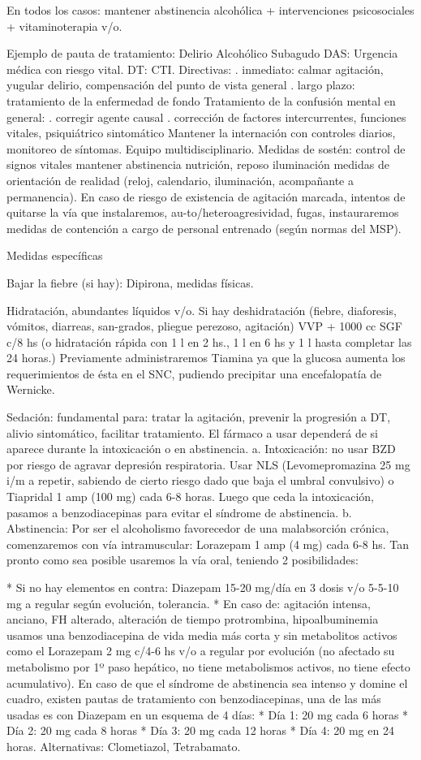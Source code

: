 \documentclass[encares.tex]{subfiles}
\begin{document}
En todos los casos: mantener abstinencia alcohólica + intervenciones psicosociales + vitaminoterapia v/o.

Ejemplo de pauta de tratamiento: Delirio Alcohólico Subagudo DAS: Urgencia médica con riesgo vital. DT: CTI. Directivas: . inmediato: calmar agitación, yugular delirio, compensación del punto de vista general . largo plazo: tratamiento de la enfermedad de fondo Tratamiento de la confusión mental en general: . corregir agente causal . corrección de factores intercurrentes, funciones vitales, psiquiátrico sintomático Mantener la internación con controles diarios, monitoreo de síntomas. Equipo multidisciplinario. Medidas de sostén: control de signos vitales mantener abstinencia nutrición, reposo iluminación medidas de orientación de realidad (reloj, calendario, iluminación, acompañante a permanencia). En caso de riesgo de existencia de agitación marcada, intentos de quitarse la vía que instalaremos, au-to/heteroagresividad, fugas, instauraremos medidas de contención a cargo de personal entrenado (según normas del MSP).

Medidas específicas

Bajar la fiebre (si hay): Dipirona, medidas físicas.

Hidratación, abundantes líquidos v/o. Si hay deshidratación (fiebre, diaforesis, vómitos, diarreas, san-grados, pliegue perezoso, agitación) VVP + 1000 cc SGF c/8 hs (o hidratación rápida con 1 l en 2 hs., 1 l en 6 hs y 1 l hasta completar las 24 horas.) Previamente administraremos Tiamina ya que la glucosa aumenta los requerimientos de ésta en el SNC, pudiendo precipitar una encefalopatía de Wernicke.

Sedación: fundamental para: tratar la agitación, prevenir la progresión a DT, alivio sintomático, facilitar tratamiento. El fármaco a usar dependerá de si aparece durante la intoxicación o en abstinencia.
a. Intoxicación: no usar BZD por riesgo de agravar depresión respiratoria. Usar NLS (Levomepromazina 25 mg i/m a repetir, sabiendo de cierto riesgo dado que baja el umbral convulsivo) o Tiapridal 1 amp (100 mg) cada 6-8 horas. Luego que ceda la intoxicación, pasamos a benzodiacepinas para evitar el síndrome de abstinencia.
b. Abstinencia: Por ser el alcoholismo favorecedor de una malabsorción crónica, comenzaremos con vía intramuscular: Lorazepam 1 amp (4 mg) cada 6-8 hs. Tan pronto como sea posible usaremos la vía oral, teniendo 2 posibilidades:

* Si no hay elementos en contra: Diazepam 15-20 mg/día en 3 dosis v/o 5-5-10 mg a regular según evolución, tolerancia.
* En caso de: agitación intensa, anciano, FH alterado, alteración de tiempo protrombina, hipoalbuminemia usamos una benzodiacepina de vida media más corta y sin metabolitos activos como el Lorazepam 2 mg c/4-6 hs v/o a regular por evolución (no afectado su metabolismo por 1º paso hepático, no tiene metabolismos activos, no tiene efecto acumulativo). En caso de que el síndrome de abstinencia sea intenso y domine el cuadro, existen pautas de tratamiento con benzodiacepinas, una de las más usadas es con Diazepam en un esquema de 4 días:
* Día 1: 20 mg cada 6 horas
* Día 2: 20 mg cada 8 horas
* Día 3: 20 mg cada 12 horas
* Día 4: 20 mg en 24 horas.
Alternativas: Clometiazol, Tetrabamato.
\end{document}
